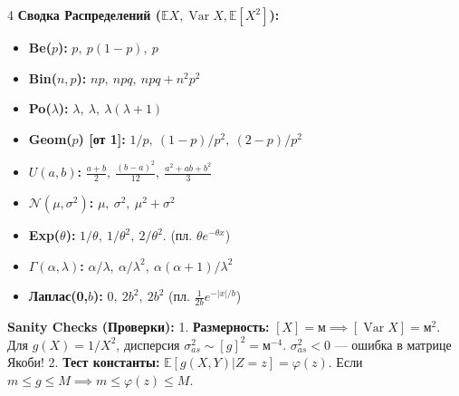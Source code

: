 \documentclass[8pt, a4paper, landscape]{extarticle}
\newcommand{\E}{\mathbb{E}}
\DeclareMathOperator{\Var}{Var}
\newcommand{\N}{\mathcal{N}}
\begin{document}
\begin{multicols*}{4}
\textbf{Сводка Распределений ($\E X, \Var X, \E[X^2]$):}
\begin{itemize}
    \item \textbf{Be($p$):} $p, \ p(1-p), \ p$
    \item \textbf{Bin($n,p$):} $np, \ npq, \ npq+n^2p^2$
    \item \textbf{Po($\lambda$):} $\lambda, \ \lambda, \ \lambda(\lambda+1)$
    \item \textbf{Geom($p$) [от 1]:} $1/p, \ (1-p)/p^2, \ (2-p)/p^2$
    \item \textbf{$U(a,b)$:} $\frac{a+b}{2}, \ \frac{(b-a)^2}{12}, \ \frac{a^2+ab+b^2}{3}$
    \item \textbf{$\N(\mu,\sigma^2)$:} $\mu, \ \sigma^2, \ \mu^2+\sigma^2$
    \item \textbf{Exp($\theta$):} $1/\theta, \ 1/\theta^2, \ 2/\theta^2$. (пл. $\theta e^{-\theta x}$)
    \item \textbf{$\Gamma(\alpha,\lambda)$:} $\alpha/\lambda, \ \alpha/\lambda^2, \ \alpha(\alpha+1)/\lambda^2$
    \item \textbf{Лаплас(0,$b$):} $0, \ 2b^2, \ 2b^2$ \quad (пл. $\frac{1}{2b}e^{-|x|/b}$)
\end{itemize}

\textbf{Sanity Checks (Проверки):}
1. \textbf{Размерность:} $[X]\!=\!\text{м} \implies [\Var X]\!=\!\text{м}^2$. Для $g(X)\!=\!1/X^2$, дисперсия $\sigma_{as}^2 \sim [g]^2 \!=\! \text{м}^{-4}$. $\sigma_{as}^2<0$ --- ошибка в матрице Якоби!
2. \textbf{Тест константы:} $\E[g(X,Y)|Z=z] = \varphi(z)$. Если $m \le g \le M \implies m \le \varphi(z) \le M$.

\end{multicols*}
\end{document}
